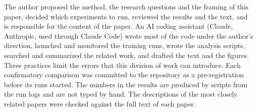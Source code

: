 The author proposed the method, the research questions and the framing of this paper, decided which
experiments to run, reviewed the results and the text, and is responsible for the content of the
paper. An AI coding assistant (Claude,
Anthropic, used through Claude Code) wrote most of the code under the author's direction, launched
and monitored the training runs, wrote the analysis scripts, searched and summarized the related
work, and drafted the text and the figures. Three practices limit the errors that this division of
work can introduce. Each confirmatory comparison was committed to the repository as a
pre-registration before its runs started. The numbers in the results are produced by scripts from
the run logs and are not typed by hand. The descriptions of the most closely related papers were
checked against the full text of each paper.
